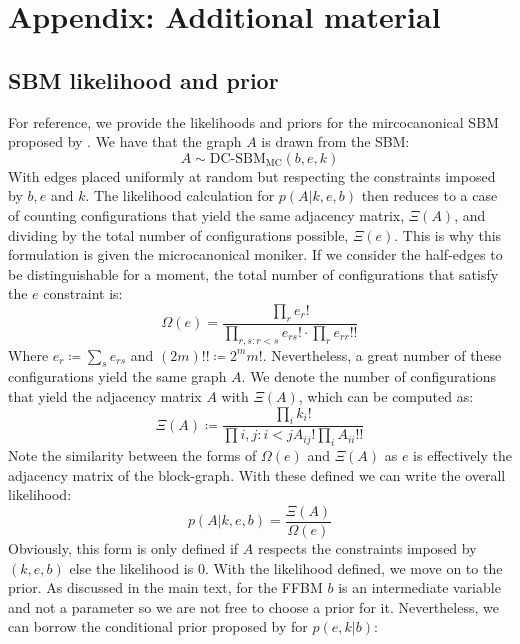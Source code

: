 \section{Appendix: Additional material}

\subsection{SBM likelihood and prior}
\label{appdx:sbm}

For reference, we provide the likelihoods and priors for the mircocanonical SBM proposed by \citet{Peixoto-Bayesian-Microcanonical}. We have that the graph $A$ is drawn from the SBM:
%
\begin{equation}
	A \sim \textrm{DC-SBM}_{\textrm{MC}}(b, e, k)
\end{equation}
%
With edges placed uniformly at random but respecting the constraints imposed by $b, e$ and $k$. The likelihood calculation for $p(A|k, e, b)$ then reduces to a case of counting configurations that yield the same adjacency matrix, $\Xi (A)$, and dividing by the total number of configurations possible, $\Xi(e)$. This is why this formulation is given the microcanonical moniker. If we consider the half-edges to be distinguishable for a moment, the total number of configurations that satisfy the $e$ constraint is:
%
\begin{equation}
	\Omega(e) = \frac{\prod_{r} e_r !}{\prod_{r,s : r < s} e_{rs}! \cdot \prod_{r} e_{rr}!!}
\end{equation}
%
Where $e_r \coloneqq \sum_{s} e_{rs}$ and $(2m)!! \coloneqq 2^m m!$. Nevertheless, a great number of these configurations yield the same graph $A$. We denote the number of configurations that yield the adjacency matrix $A$ with $\Xi(A)$, which can be computed as:
%
\begin{equation}
	\Xi(A) \coloneqq \frac{\prod_i k_i !}{\prod i,j : i < j A_{ij} ! \prod_i A_{ii} !! }
\end{equation}
%
Note the similarity between the forms of $\Omega(e)$ and $\Xi(A)$ as $e$ is effectively the adjacency matrix of the block-graph. With these defined we can write the overall likelihood:
%
\begin{equation}
	p(A|k,e,b) = \frac{\Xi(A)}{\Omega(e)}
\end{equation}
%
Obviously, this form is only defined if $A$ respects the constraints imposed by $(k,e,b)$ else the likelihood is 0. With the likelihood defined, we move on to the prior. As discussed in the main text, for the FFBM $b$ is an intermediate variable and not a parameter so we are not free to choose a prior for it. Nevertheless, we can borrow the conditional prior proposed by \citet{Peixoto-Bayesian-Microcanonical} for $p(e, k | b)$:
